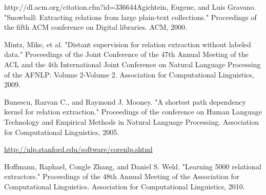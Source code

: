 \begin{thebibliography}{9}
  \label{snowball}
 http://dl.acm.org/citation.cfm?id=336644Agichtein, Eugene, and Luis Gravano. "Snowball: Extracting relations from large plain-text collections." Proceedings of the fifth ACM conference on Digital libraries. ACM, 2000.
 
  \label{mintz}
Mintz, Mike, et al. "Distant supervision for relation extraction without labeled data." Proceedings of the Joint Conference of the 47th Annual Meeting of the ACL and the 4th International Joint Conference on Natural Language Processing of the AFNLP: Volume 2-Volume 2. Association for Computational Linguistics, 2009.
 
  \label{shortestpathdep}
 Bunescu, Razvan C., and Raymond J. Mooney. "A shortest path dependency kernel for relation extraction." Proceedings of the conference on Human Language Technology and Empirical Methods in Natural Language Processing. Association for Computational Linguistics, 2005.
 
  \label{corenlp}
 \url{http://nlp.stanford.edu/software/corenlp.shtml}
 
 \label{5000rel}
Hoffmann, Raphael, Congle Zhang, and Daniel S. Weld. "Learning 5000 relational extractors." Proceedings of the 48th Annual Meeting of the Association for Computational Linguistics. Association for Computational Linguistics, 2010.

\end{thebibliography}
